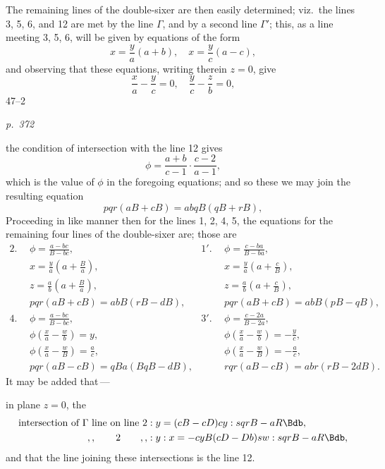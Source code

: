 \documentclass[11pt,a4paper]{book}
\begin{document}
The remaining lines of the double-sixer are then easily determined; viz.\ the lines
3, 5, 6, and 12 are met by the line $\Gamma$, and by a second line $\Gamma'$; this, as a line
meeting 3, 5, 6, will be given by equations of the form
\[
x = \frac{y}{a} (a + b), \quad x = \frac{y}{c} (a - c),
\]
and observing that these equations, writing therein $z = 0$, give
\[
\frac{x}{a} - \frac{y}{c} = 0, \quad \frac{y}{c} - \frac{z}{b} = 0,
\]
\hfill 47--2

\clearpage

\bigskip
\textit{p.~372}
\smallskip

\noindent
the condition of intersection with the line 12 gives
\[
\phi = \frac{a + b}{c - 1}\cdot \frac{c - 2}{a - 1},
\]
which is the value of $\phi$ in the foregoing equations; and so these we may join the
resulting equation
\[
pqr(aB + cB) = abqB(qB + rB),
\]
Proceeding in like manner then for the lines 1, 2, 4, 5, the equations for the remaining
four lines of the double-sixer are; those are
\begin{align*}
2.\ \ & \phi = \frac{a - bc}{B - bc}, & 1'.\ \ & \phi = \frac{c - ba}{B - ba}, \\
&x = \frac{y}{a}(a + \tfrac{B}{a}), & & x = \frac{y}{a}(a + \tfrac{c}{B}), \\
&z = \frac{a}{b}(a + \tfrac{B}{a}), & & z = \frac{a}{b}(a + \tfrac{c}{B}), \\
&pqr(aB + cB) = abB(rB - dB), & & pqr(aB + cB) = abB(pB - qB), \\
4.\ \ & \phi = \frac{a - bc}{B - bc}, & 3'.\ \ & \phi = \frac{c - 2a}{B - 2a}, \\
&\phi\left(\frac{x}{a} - \frac{w}{b}\right) = y, & & \phi\left(\frac{x}{a} - \frac{w}{b}\right) = -\frac{y}{c}, \\
&\phi\left(\frac{x}{a} - \frac{w}{B}\right) = \tfrac{a}{c}, & & \phi\left(\frac{x}{a} - \frac{w}{B}\right) = -\frac{a}{c}, \\
&pqr(aB - cB) = qBa(BqB - dB), & & rqr(aB - cB) = abr(rB - 2 dB).
\end{align*}
It may be added that\,---

in plane $z = 0$, the
\begin{align*}
\text{intersection of } \Gamma \text{ line on line } 2 &: y = (cB - cD) cy : sqrB - aR\Bdb, \\
,, \qquad 2 \qquad ,, &: y : x = -cyB(cD - Db) sw : sqrB - aR\Bdb,
\end{align*}
and that the line joining these intersections is the line 12.
\end{document}
